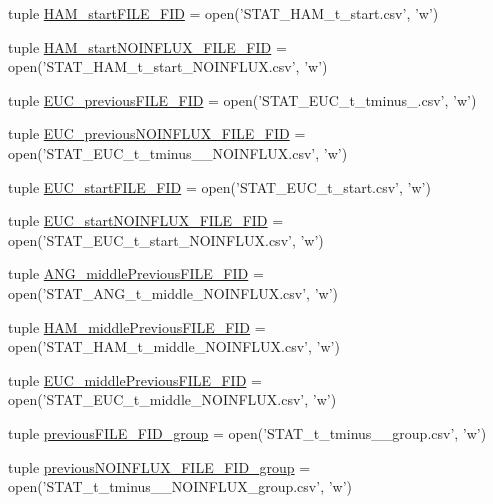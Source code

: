 \begin{DoxyCompactItemize}
\item 
tuple \hyperlink{a00104_abb14887e587e1107fc13046ad313077e}{H\-A\-M\-\_\-start\-F\-I\-L\-E\-\_\-\-F\-I\-D} = open('S\-T\-A\-T\-\_\-\-H\-A\-M\-\_\-t\-\_\-start.\-csv', 'w')
\item 
tuple \hyperlink{a00104_ab8a3b402c0b418cc290889a5f6482280}{H\-A\-M\-\_\-start\-N\-O\-I\-N\-F\-L\-U\-X\-\_\-\-F\-I\-L\-E\-\_\-\-F\-I\-D} = open('S\-T\-A\-T\-\_\-\-H\-A\-M\-\_\-t\-\_\-start\-\_\-\-N\-O\-I\-N\-F\-L\-U\-X.\-csv', 'w')
\item 
tuple \hyperlink{a00104_a3548edac9afffda077dcbd2876616b39}{E\-U\-C\-\_\-previous\-F\-I\-L\-E\-\_\-\-F\-I\-D} = open('S\-T\-A\-T\-\_\-\-E\-U\-C\-\_\-t\-\_\-tminus\-\_.\-csv', 'w')
\item 
tuple \hyperlink{a00104_aa2efc59329473a7bbeaf3ce32ec4dc3d}{E\-U\-C\-\_\-previous\-N\-O\-I\-N\-F\-L\-U\-X\-\_\-\-F\-I\-L\-E\-\_\-\-F\-I\-D} = open('S\-T\-A\-T\-\_\-\-E\-U\-C\-\_\-t\-\_\-tminus\-\_\-\_\-\-N\-O\-I\-N\-F\-L\-U\-X.\-csv', 'w')
\item 
tuple \hyperlink{a00104_a3d812ff298612e6aae54e7a9abfddbf2}{E\-U\-C\-\_\-start\-F\-I\-L\-E\-\_\-\-F\-I\-D} = open('S\-T\-A\-T\-\_\-\-E\-U\-C\-\_\-t\-\_\-start.\-csv', 'w')
\item 
tuple \hyperlink{a00104_a8ae5873fd9b162495a512e314047e930}{E\-U\-C\-\_\-start\-N\-O\-I\-N\-F\-L\-U\-X\-\_\-\-F\-I\-L\-E\-\_\-\-F\-I\-D} = open('S\-T\-A\-T\-\_\-\-E\-U\-C\-\_\-t\-\_\-start\-\_\-\-N\-O\-I\-N\-F\-L\-U\-X.\-csv', 'w')
\item 
tuple \hyperlink{a00104_aa5eb16eef2c90e2ccc991eb176280f21}{A\-N\-G\-\_\-middle\-Previous\-F\-I\-L\-E\-\_\-\-F\-I\-D} = open('S\-T\-A\-T\-\_\-\-A\-N\-G\-\_\-t\-\_\-middle\-\_\-\-N\-O\-I\-N\-F\-L\-U\-X.\-csv', 'w')
\item 
tuple \hyperlink{a00104_aaf0dd6e74d88a7cf2e909301b422c17d}{H\-A\-M\-\_\-middle\-Previous\-F\-I\-L\-E\-\_\-\-F\-I\-D} = open('S\-T\-A\-T\-\_\-\-H\-A\-M\-\_\-t\-\_\-middle\-\_\-\-N\-O\-I\-N\-F\-L\-U\-X.\-csv', 'w')
\item 
tuple \hyperlink{a00104_afcb9ec3ed11cfcacae8f796af7605425}{E\-U\-C\-\_\-middle\-Previous\-F\-I\-L\-E\-\_\-\-F\-I\-D} = open('S\-T\-A\-T\-\_\-\-E\-U\-C\-\_\-t\-\_\-middle\-\_\-\-N\-O\-I\-N\-F\-L\-U\-X.\-csv', 'w')
\item 
tuple \hyperlink{a00104_a9e72c152be1f5aac24af10b353b16390}{previous\-F\-I\-L\-E\-\_\-\-F\-I\-D\-\_\-group} = open('S\-T\-A\-T\-\_\-t\-\_\-tminus\-\_\-\_\-group.\-csv', 'w')
\item 
tuple \hyperlink{a00104_a648b56a19ba8992cdb56d307ed22eb41}{previous\-N\-O\-I\-N\-F\-L\-U\-X\-\_\-\-F\-I\-L\-E\-\_\-\-F\-I\-D\-\_\-group} = open('S\-T\-A\-T\-\_\-t\-\_\-tminus\-\_\-\_\-\-N\-O\-I\-N\-F\-L\-U\-X\-\_\-group.\-csv', 'w')

\end{DoxyCompactItemize}
